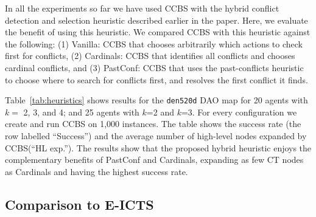 \documentclass[review]{elsarticle}
\newcommand{\history}{past-conflicts\xspace}
\newcommand{\ccbs}{\ac{CCBS}\xspace}
\newcommand{\ct}{\ac{CT}\xspace}
\begin{document}

In all the experiments so far we have used \ccbs with the hybrid conflict detection and selection heuristic described earlier in the paper. Here, we evaluate the benefit of using this heuristic. We compared \ccbs with this heuristic against the following: (1) Vanilla: \ccbs that chooses arbitrarily which actions to check first for conflicts, 
(2) Cardinals: \ccbs that identifies all conflicts and chooses cardinal conflicts,   
and (3) PastConf: \ccbs that uses the \history heuristic to choose where to search for conflicts first, and resolves the first conflict it finds.  

Table~\ref{tab:heuristics} shows results for the \texttt{den520d} DAO map for 20 agents with $k=$ 2, 3, and 4; and 25 agents with $k$=2 and $k$=3. For every configuration we create and run \ccbs on 1,000 instances. The table shows the success rate (the row labelled ``Success'')  
and the average number of high-level nodes expanded by \ccbs (``HL exp.''). The results show that the proposed hybrid heuristic 
enjoys the complementary benefits of PastConf and Cardinals, 
expanding as few \ct nodes as Cardinals 
and having the highest success rate. %


\subsection{Comparison to E-ICTS}
\end{document}
